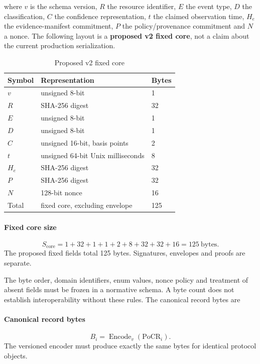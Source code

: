 \documentclass[10pt,a4paper]{article}
\begin{document}
where \(v\) is the schema version, \(R\) the resource identifier, \(E\) the event type, \(D\) the classification, \(C\) the confidence representation, \(t\) the claimed observation time, \(H_e\) the evidence-manifest commitment, \(P\) the policy/provenance commitment and \(N\) a nonce. The following layout is a \textbf{proposed v2 fixed core}, not a claim about the current production serialization.


\begin{longtable}{p{}p{}p{}}
\caption{Proposed v2 fixed core}\\
\toprule
Symbol & Representation & Bytes\\
\midrule
\endhead
\(v\) & unsigned 8-bit & 1\\
\(R\) & SHA-256 digest & 32\\
\(E\) & unsigned 8-bit & 1\\
\(D\) & unsigned 8-bit & 1\\
\(C\) & unsigned 16-bit, basis points & 2\\
\(t\) & unsigned 64-bit Unix milliseconds & 8\\
\(H_e\) & SHA-256 digest & 32\\
\(P\) & SHA-256 digest & 32\\
\(N\) & 128-bit nonce & 16\\
Total & fixed core, excluding envelope & 125\\
\bottomrule
\end{longtable}


\paragraph{Fixed core size}
\[S_{\mathrm{core}}=1+32+1+1+2+8+32+32+16=125\ \mathrm{bytes}.\]
The proposed fixed fields total 125 bytes. Signatures, envelopes and proofs are separate.


The byte order, domain identifiers, enum values, nonce policy and treatment of absent fields must be frozen in a normative schema. A byte count does not establish interoperability without these rules. The canonical record bytes are


\paragraph{Canonical record bytes}
\[B_i=\operatorname{Encode}_v(\mathrm{PoCR}_i).\]
The versioned encoder must produce exactly the same bytes for identical protocol objects.
\end{document}
